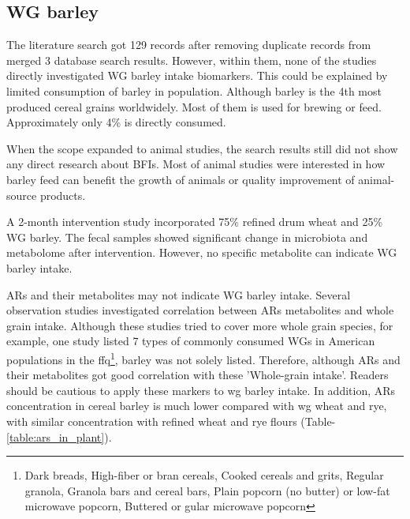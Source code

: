 \subsection{WG barley}
The literature search got 129 records after removing duplicate records from merged 3 database search results. However, within them, none of the studies directly investigated WG barley intake biomarkers. This could be explained by limited consumption of barley in population. Although barley is the 4th most produced cereal grains worldwidely. Most of them is used for brewing or feed. Approximately only 4\% is directly consumed\cite{Baik2008}.

When the scope expanded to animal studies, the search results still did not show any direct research about BFIs. Most of animal studies were interested in how barley feed can benefit the growth of animals or quality improvement of animal-source products\cite{ISI:000272990200002,Foster2003}.

A 2-month intervention study\cite{DeAngelis2015} incorporated 75\% refined drum wheat and 25\% WG barley. The fecal samples showed significant change in microbiota and metabolome after intervention\cite{DeAngelis2015}. However, no specific metabolite can indicate WG barley intake.

ARs and their metabolites may not indicate WG barley intake. Several observation studies\cite{ISI:000309032000011,ISI:000259554500019} investigated correlation between ARs metabolites and whole grain intake. Although these studies tried to cover more whole grain species, for example, one study\cite{ISI:000259554500019} listed 7 types of commonly consumed WGs in American populations in the \acrfull{ffq}\footnote{Dark breads, High-fiber or bran cereals, Cooked cereals and grits, Regular granola, Granola bars and cereal bars, Plain popcorn (no butter) or low-fat microwave popcorn, Buttered or gular microwave popcorn}, barley was not solely listed. Therefore, although ARs and their metabolites got good correlation with these 'Whole-grain intake'. Readers should be cautious to apply these markers to \acrshort{wg} barley intake. 
In addition, ARs concentration in cereal barley is much lower compared with \acrshort{wg} wheat and rye, with similar concentration with refined wheat and rye flours (Table-\ref{table:ars_in_plant}). 

